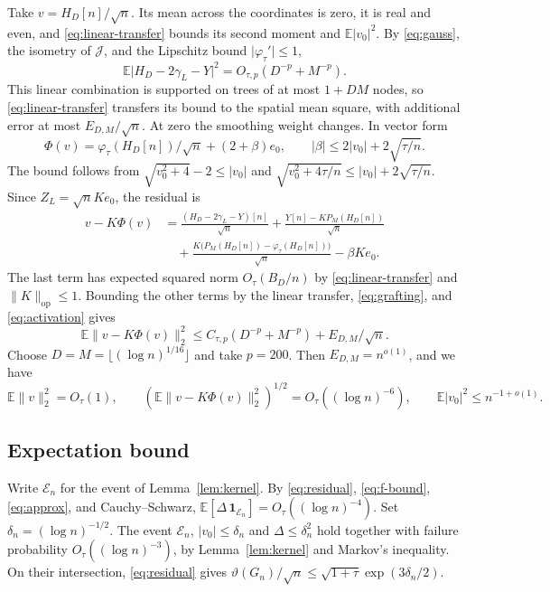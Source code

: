 \documentclass[11pt,letterpaper]{article}
\newcommand{\E}{\mathbb E}
\newcommand{\one}{\mathbf 1}
\newcommand{\abs}[1]{\lvert #1\rvert}
\newcommand{\norm}[1]{\lVert #1\rVert}
\newcommand{\op}{\mathrm{op}}
\begin{document}
Take \(v=H_D[n]/\sqrt n\). Its mean across the coordinates is zero,
it is real and even, and \eqref{eq:linear-transfer} bounds its second
moment and \(\E\abs{v_0}^2\). By \eqref{eq:gauss}, the isometry of
\(\mathcal J\), and the Lipschitz bound \(\abs{\varphi_\tau'}\le1\),
\[
 \E\abs{H_D-2\gamma_L-Y}^2=O_{\tau,p}(D^{-p}+M^{-p}).
\]
This linear combination is supported on trees of at most \(1+DM\)
nodes, so \eqref{eq:linear-transfer} transfers its bound to the spatial
mean square, with additional error at most \(E_{D,M}/\sqrt n\).
At zero the smoothing weight changes. In vector form
\[
 \Phi(v)=\varphi_\tau(H_D[n])/\sqrt n+(2+\beta)e_0,
 \qquad \abs\beta\le 2\abs{v_0}+2\sqrt{\tau/n}.
\]
The bound follows from \(\sqrt{v_0^2+4}-2\le\abs{v_0}\) and
\(\sqrt{v_0^2+4\tau/n}\le\abs{v_0}+2\sqrt{\tau/n}\).
Since \(Z_L=\sqrt n K e_0\), the residual is
\begin{align*}
 v-K\Phi(v)
 &=\frac{(H_D-2\gamma_L-Y)[n]}{\sqrt n}
   +\frac{Y[n]-K P_M(H_D[n])}{\sqrt n}\\
 &\quad+\frac{K\bigl(P_M(H_D[n])-\varphi_\tau(H_D[n])\bigr)}{\sqrt n}
   -\beta K e_0.
\end{align*}
The last term has expected squared norm \(O_\tau(B_D/n)\) by
\eqref{eq:linear-transfer} and \(\norm K_{\op}\le1\).
Bounding the other terms by the linear transfer,
\eqref{eq:grafting}, and \eqref{eq:activation} gives
\[
 \E\norm{v-K\Phi(v)}_2^2
 \le C_{\tau,p}(D^{-p}+M^{-p})+E_{D,M}/\sqrt n.
\]
Choose \(D=M=\lfloor(\log n)^{1/16}\rfloor\) and take \(p=200\).
Then \(E_{D,M}=n^{o(1)}\), and we have
\begin{equation}\label{eq:approx}
 \E\norm v_2^2=O_\tau(1),\qquad
 (\E\norm{v-K\Phi(v)}_2^2)^{1/2}=O_\tau((\log n)^{-6}),\qquad
 \E\abs{v_0}^2\le n^{-1+o(1)}.
\end{equation}

\subsection{Expectation bound}

Write \(\mathcal E_n\) for the event of Lemma~\ref{lem:kernel}.
By \eqref{eq:residual}, \eqref{eq:f-bound}, \eqref{eq:approx}, and
Cauchy--Schwarz, \(\E[\Delta\,\one_{\mathcal E_n}]=O_\tau((\log n)^{-4})\).
Set \(\delta_n=(\log n)^{-1/2}\). The event \(\mathcal E_n\), \(\abs{v_0}\le\delta_n\)
and \(\Delta\le\delta_n^2\) hold together with failure probability
\(O_\tau((\log n)^{-3})\), by Lemma~\ref{lem:kernel} and Markov's
inequality. On their intersection,
\eqref{eq:residual} gives
\(\vartheta(G_n)/\sqrt n\le\sqrt{1+\tau}\exp(3\delta_n/2)\).
\end{document}
